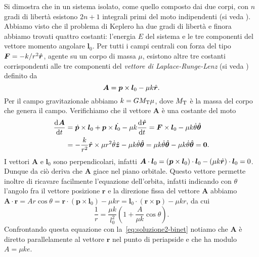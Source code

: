 {Si dimostra che in un sistema isolato, come quello composto dai due corpi, con
$n$ gradi di libertà esistono $2n+1$ integrali primi del moto indipendenti (si
veda \textcite{landau:meccanica}). Abbiamo visto che il problema di Keplero ha
due gradi di libertà e finora abbiamo trovati quattro costanti: l'energia $E$
del sistema e le tre componenti del vettore momento angolare $\bm{l}_0$. Per
tutti i campi centrali con forza del tipo $\bm{F} = -k/r^2\hat{\bm{r}}$, agente su
un corpo di massa $\mu$, esistono altre tre costanti corrispondenti alle tre
componenti del \emph{vettore di Laplace-Runge-Lenz} (si veda
\textcite{goldstein:meccanica}) definito da
\begin{equation}
  \bm{A} = \bm{p}\times\bm{l}_0 - \mu k\hat{\bm{r}}.
\end{equation}
Per il campo gravitazionale abbiamo $k=GM_\textup{T}\mu$, dove $M_\textup{T}$ è
la massa del corpo che genera il campo. Verifichiamo che il vettore $\bm{A}$ è
una costante del moto
\begin{equation}
  \begin{split}
    \frac{{\mathop{}\!\mathrm{d}^{}}\bm{A}}{\mathop{}\!\mathrm{d} {t}^{}} &= \dot{\bm{p}}\times\bm{l}_0 + \bm{p}\times\dot{\bm{l}_0}
    - \mu k\frac{{\mathop{}\!\mathrm{d}^{}}\hat{\bm{r}}}{\mathop{}\!\mathrm{d} {t}^{}} = \bm{F}\times\bm{l}_0 - \mu
    k\dot{\theta}\hat{\bm{\theta}} \\
    &= -\frac{k}{r^2}\hat{\bm{r}}\times \mu r^2\dot{\theta}\hat{\bm{z}} -
    \mu k\dot{\theta}\hat{\bm{\theta}} = \mu k\dot{\theta}\hat{\bm{\theta}} -
    \mu k\dot{\theta}\hat{\bm{\theta}} = \bm{0}.
  \end{split}
\end{equation}
I vettori $\bm{A}$ e $\bm{l}_0$ sono perpendicolari, infatti
$\bm{A}\cdot\bm{l}_0 = (\bm{p}\times\bm{l}_0)\cdot\bm{l}_0 - (\mu
k\hat{\bm{r}})\cdot\bm{l}_0 = 0$.
Dunque da ciò deriva che $\bm{A}$ giace nel piano orbitale. Questo vettore
permette inoltre di ricavare facilmente l'equazione dell'orbita, infatti
indicando con $\theta$ l'angolo fra il vettore posizione $\bm{r}$ e la direzione
fissa del vettore $\bm{A}$ abbiamo
$\bm{A}\cdot\bm{r} = Ar\cos\theta = \bm{r}\cdot(\bm{p}\times\bm{l}_0) - \mu kr =
\bm{l}_0\cdot(\bm{r}\times\bm{p}) - \mu kr$, da cui
\begin{equation}
  \frac{1}{r} = \frac{\mu k}{l_0^2}
  \left(
    1 + \frac{A}{\mu k}\cos\theta
  \right).
\end{equation}
Confrontando questa equazione con la~\eqref{eq:soluzione2-binet} notiamo che
$\bm{A}$ è diretto parallelamente al vettore $\bm{r}$ nel punto di periapside e
che ha modulo $A = \mu ke$.

}
